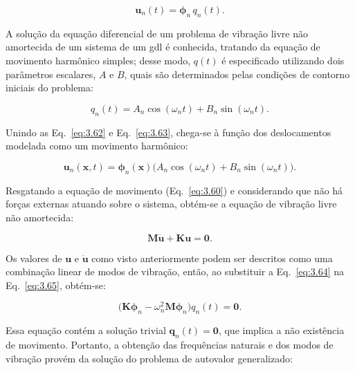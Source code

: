 \begin{equation}
    \mathbf{u}_n(t) = \boldsymbol{\phi}_n \, q_n(t).
    \label{eq:3.62}
\end{equation}

\indent A solução da equação diferencial de um problema de vibração livre não amortecida de um sistema de um gdl é conhecida, tratando da equação de movimento harmônico simples; desse modo, $q(t)$ é especificado utilizando dois parâmetros escalares, $A$ e $B$, quais são determinados pelas condições de contorno iniciais do problema: 

\begin{equation}
    q_n(t) = A_n \cos{(\omega_n t)} + B_n \sin{(\omega_n t)}.
    \label{eq:3.63}
\end{equation}

\indent Unindo as Eq.~\ref{eq:3.62} e Eq.~\ref{eq:3.63}, chega-se à função dos deslocamentos modelada como um movimento harmônico:

\begin{equation}
    \mathbf{u}_n(\mathbf{x},t) = \boldsymbol{\phi}_n(\mathbf{x})\bigl(A_n \cos{(\omega_n t)} + B_n \sin{(\omega_n t)}\bigr).
    \label{eq:3.64}
\end{equation}

\indent Resgatando a equação de movimento (Eq.~\ref{eq:3.60}) e considerando que não há forças externas atuando sobre o sistema, obtém-se a equação de vibração livre não amortecida:

\begin{equation}
    \mathbf{M}\ddot{\mathbf{u}} + \mathbf{K}\mathbf{u}= \mathbf{0}.
    \label{eq:3.65}
\end{equation}

\indent Os valores de $\mathbf{u}$ e $\ddot{\mathbf{u}}$ como visto anteriormente podem ser descritos como uma combinação linear de modos de vibração, então, ao substituir a Eq.~\ref{eq:3.64} na Eq.~\ref{eq:3.65}, obtém-se:

\begin{equation}
    \bigl(\mathbf{K}\boldsymbol{\phi}_n -  \omega_n^2 \mathbf{M}\boldsymbol{\phi}_n\bigr) q_n(t) = \mathbf{0}.
    \label{eq:3.66}
\end{equation}

\indent Essa equação contém a solução trivial $\boldsymbol{q}_n(t) = \mathbf{0}$, que implica a não existência de movimento. Portanto, a obtenção das frequências naturais e dos modos de vibração provém da solução do problema de autovalor generalizado:

